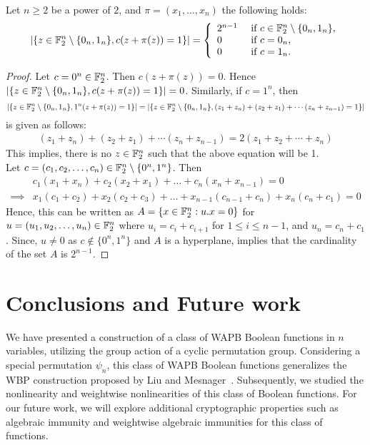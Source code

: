 \documentclass{llncs}
\begin{document}
\begin{proposition}
	Let $n\ge 2$ be a power of $2$, and $\pi= (x_1,\ldots,x_n)$ the following holds:
\[ |\{ z \in \mathbb{F}_2^{n} \setminus \{0_{n},1_{n}\},  c(z+\pi(z))=1   \}| 
= \left \{
\begin{array}{l l}
	2^{n-1}  & \text{ if } c \in \mathbb{F}_2^n \setminus \{0_n,1_n\}, \\
	0  & \text{ if } c=0_n,\\
	0 & \text{ if } c=1_n.
\end{array}\right.\]
	
\end{proposition}
\begin{proof}
	Let $ c = 0^n \in \mathbb{F}_2^n$. Then $c(z + \pi(z))=0$. Hence $|\{ z \in \mathbb{F}_2^{n} \setminus \{0_{n},1_{n}\}, c(z+\pi(z))=1   \}| = 0$. Similarly, if $c = 1^n$, then  $$|\{ z \in \mathbb{F}_2^{n} \setminus \{0_{n},1_{n}\}, 1^n(z+\pi(z))=1   \}| = |\{ z \in \mathbb{F}_2^{n} \setminus \{0_{n},1_{n}\}, (z_1 + z_n)+(z_2 + z_1)+ \cdots (z_n + z_{n-1})= 1 \}|$$ is given as follows:
	\begin{align*}
	(z_1 + z_n)+(z_2 + z_1)+ \cdots (z_n + z_{n-1}) = 2(z_1 + z_2 + \cdots + z_n) 
	\end{align*}
	This implies, there is no $z \in \mathbb{F}_2^n$ such that the above equation will be 1. \\
Let $c=(c_1,c_2,\ldots,c_n) \in \mathbb{F}_2^n \setminus \{0^n,1^n\}$. Then 
\begin{align*}
         & c_1(x_1 + x_n) + c_2(x_2 + x_1) + \ldots + c_n (x_n + x_{n-1})  = 0 \\
\implies &  x_1 ( c_1 + c_2) + x_2 (c_2 + c_3) + \ldots + x_{n-1}(c_{n-1} + c_n) + x_n(c_n + c_1)= 0  
\end{align*}
Hence, this can be written as $A= \{ x \in \mathbb{F}_2^n : u. x = 0\}$ for $ u = (u_1,u_2, \ldots,u_n) \in \mathbb{F}_2^n$ where $ u_i = c_i + c_{i+1}$ for $  1 \leq i \leq {n-1} $, and $u_n = c_n + c_1$. Since, $ u \neq 0 $ as $c \not\in \{0^n,1^n\}$ and $A$ is a hyperplane, implies that the cardinality of the set $A$ is $2^{n-1}$.
\end{proof}
\fi

\section{Conclusions and Future work}
We have presented a construction of a class of WAPB Boolean functions in $n$ variables, utilizing the group action of a cyclic permutation group. Considering a special permutation $\psi_n$, this class of WAPB Boolean functions generalizes the WBP construction proposed by Liu and Mesnager~\cite{DCC:LiuMes19}. 
Subsequently, we studied the nonlinearity and weightwise nonlinearities of this class of Boolean functions. 
For our future work, we will explore additional cryptographic properties such as algebraic immunity and weightwise algebraic immunities for this class of functions.

\ifnum{}
%


\else


	
	
\end{document}
